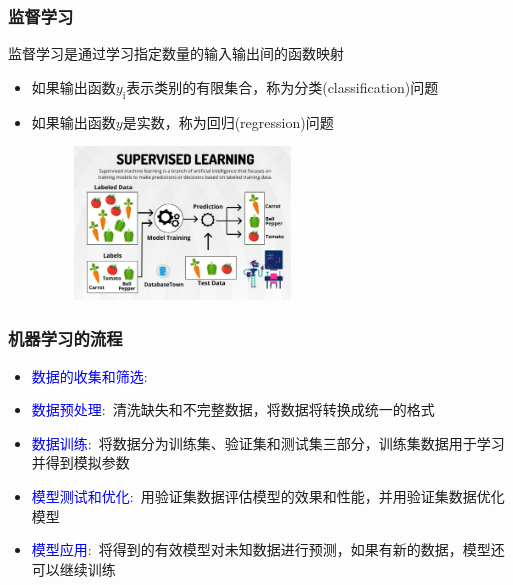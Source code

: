 \frame
{
	\frametitle{监督学习}
	监督学习是通过学习指定数量的输入输出间的函数映射
\begin{itemize}
	\item 如果输出函数$y_{\mathrm{i}}$表示类别的有限集合，称为分类\textrm{(classification)}问题
		\vskip 2pt
		{\fontsize{8.0pt}{4.2pt}\selectfont{模型可用来预测未知数据所属类型}}
	\item 如果输出函数$y$是实数，称为回归\textrm{(regression)}问题
		\vskip 2pt
		{\fontsize{8.0pt}{4.2pt}\selectfont{模型可用来预测未知输入数据对应的值输出值}}
\end{itemize}
\begin{figure}[h!]
\centering
\vspace*{-0.1in}
\includegraphics[height=1.6in,width=2.8in,viewport=0 0 1075 720,clip]{Figures/ML_Supervised-Learning-2.jpg}
\caption{\tiny{}}%
\label{ML_Supervised-Learning}
\end{figure}
}

\frame
{
	\frametitle{机器学习的流程}
\begin{itemize}
	\item \textcolor{blue}{数据的收集和筛选}:~{\fontsize{8.0pt}{4.2pt}\selectfont{从现有数据中产生并选择与问题解决有用和相关的数据子集}}
	\item \textcolor{blue}{数据预处理}:~清洗缺失和不完整数据，将数据将转换成统一的格式{\fontsize{8.0pt}{4.2pt}\selectfont{(如整型、字符串型等)}}%
	\item \textcolor{blue}{数据训练}:~将数据分为训练集、验证集和测试集三部分，训练集数据用于学习并得到模拟参数{\fontsize{8.0pt}{4.2pt}\selectfont{(主要针对监督学习)}}
	\item \textcolor{blue}{模型测试和优化}:~用验证集数据评估模型的效果和性能，并用验证集数据优化模型
		\vskip 3pt
		{\fontsize{8.0pt}{4.2pt}\selectfont{一旦完成优化，用测试集数据评定模型的性能}}%
	\item \textcolor{blue}{模型应用}:~将得到的有效模型对未知数据进行预测，如果有新的数据，模型还可以继续训练
\end{itemize}
}

